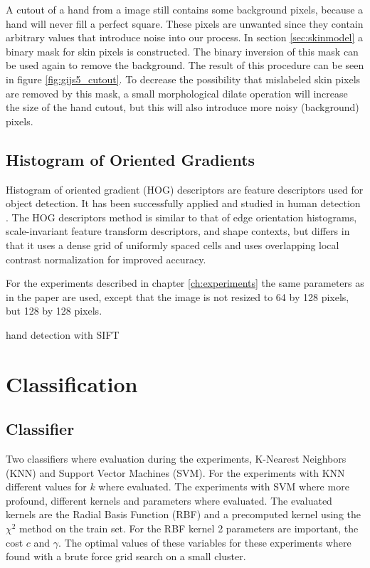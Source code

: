 A cutout of a hand from a image still contains some background pixels, because a hand will never fill a perfect square. These pixels are unwanted since they contain arbitrary values that introduce noise into our process. In section \ref{sec:skinmodel} a binary mask for skin pixels is constructed. The binary inversion of this mask can be used again to remove the background. The result of this procedure can be seen in figure \ref{fig:gijs5_cutout}. To decrease the possibility that mislabeled skin pixels are removed by this mask, a small morphological dilate operation will increase the size of the hand cutout, but this will also introduce more noisy (background) pixels.


\subsection*{Histogram of Oriented Gradients}
Histogram of oriented gradient (HOG) descriptors are feature descriptors used for object detection. It has been successfully applied and studied in human detection \cite{NavneetDalal2006}.  The HOG descriptors method is similar to that of edge orientation histograms, scale-invariant feature transform descriptors, and shape contexts, but differs in that it uses a dense grid of uniformly spaced cells and uses overlapping local contrast normalization for improved accuracy.

For the experiments described in chapter \ref{ch:experiments} the same parameters as in the \cite{watanabe2009} paper are used, except that the image is not resized to 64 by 128 pixels, but 128 by 128 pixels.

hand detection with SIFT\cite{Wang2007}

\section{Classification}

\subsection*{Classifier}
Two classifiers where evaluation during the experiments, K-Nearest Neighbors (KNN) and Support Vector Machines (SVM). For the experiments with KNN different values for $k$ where evaluated. The experiments with SVM where more profound, different kernels and parameters where evaluated. The evaluated kernels are the Radial Basis Function (RBF) and a precomputed kernel using the $\chi^2$ method on the train set. For the RBF kernel 2 parameters are important, the cost $c$ and $\gamma$. The optimal values of these variables for these experiments where found with a brute force grid search on a small cluster.

